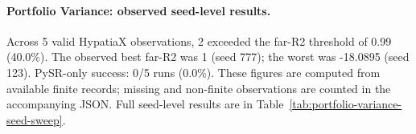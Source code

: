 \paragraph{Portfolio Variance: observed seed-level results.}
Across 5 valid HypatiaX observations, 2 exceeded the far-R2 threshold of 0.99 (40.0\%).
The observed best far-R2 was 1 (seed 777);
the worst was -18.0895 (seed 123).
PySR-only success: 0/5 runs (0.0\%).
These figures are computed from available finite records; missing and non-finite observations are counted in the accompanying JSON.
Full seed-level results are in Table~\ref{tab:portfolio-variance-seed-sweep}.

